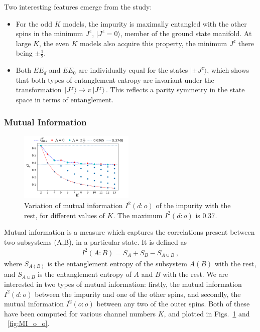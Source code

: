 \documentclass{iopart}
\begin{document}
Two interesting features emerge from the study:
\begin{itemize}
	\item For the odd \(K\) models, the impurity is maximally entangled with the other spins in the minimum \(J^z\), $|J^z=0\rangle$, member of the ground state manifold.
	At large \(K\), the even \(K\) models also acquire this property, the minimum \(J^z\) there being \(\pm \frac{1}{2}\).
	\item 
	Both \(EE_d\) and \(EE_0\) are individually equal for the states $|\pm J^z\rangle$, which shows that both types of entanglement entropy are invariant under the transformation \(\ket{J^z} \to \pi \ket{J^z}\). This reflects a parity symmetry in the state space in terms of entanglement.
\end{itemize}

\subsubsection{Mutual Information}

\begin{figure}[!htpb]
\includegraphics[width=0.49\textwidth]{NEW31DecI2vsNch01}
\caption{Variation of mutual information $I^2(d:o)$ of the impurity with the rest, for different values of $K$. The maximum $I^2(d:o)$ is $0.37$.}
\label{fig:MI_d_o}
\end{figure}

Mutual information is a measure which captures the correlations present between two subsystems (A,B), in a particular state. It is defined as
\begin{eqnarray}
I^2(A:B)=S_A+S_B-S_{A\cup B}~,
\end{eqnarray}
where $S_{A(B)}$ is the entanglement entropy of the subsystem $A(B)$ with the rest, and \(S_{A\cup B}\) is the entanglement entropy of \(A\) and \(B\) with the rest.
We are interested in two types of mutual information: firstly, the mutual information $I^2(d:o)$ between the impurity and one of the other spins, and secondly, the mutual information $I^2(o:o)$ between any two of the outer spins.
Both of these have been computed for various channel numbers \(K\), and plotted in Figs.~\ref{fig:MI_d_o} and ~\ref{fig:MI_o_o}.
\end{document}

